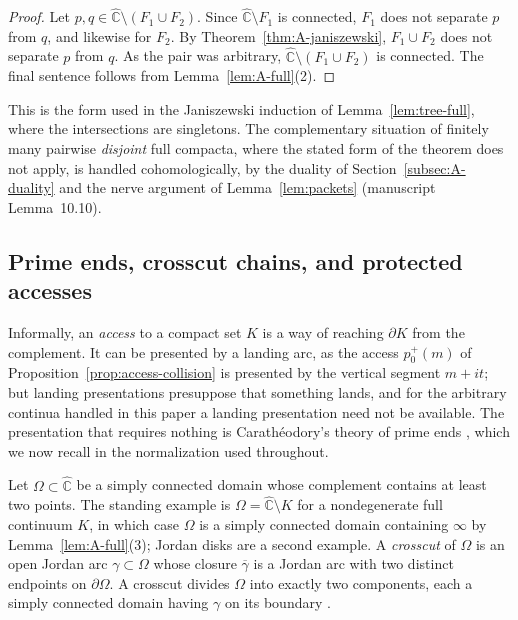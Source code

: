 \documentclass[11pt,reqno]{amsart}
\theoremstyle{definition}
\theoremstyle{remark}
\newcommand{\Chat}{\widehat{\mathbb C}}
\begin{document}
\begin{proof}
Let $p,q\in\Chat\setminus(F_1\cup F_2)$.  Since $\Chat\setminus F_1$ is
connected, $F_1$ does not separate $p$ from $q$, and likewise for $F_2$.
By Theorem~\ref{thm:A-janiszewski}, $F_1\cup F_2$ does not separate $p$
from $q$.  As the pair was arbitrary, $\Chat\setminus(F_1\cup F_2)$ is
connected.  The final sentence follows from Lemma~\ref{lem:A-full}(2).
\end{proof}

This is the form used in the Janiszewski induction of
Lemma~\ref{lem:tree-full}, where the intersections are singletons.  The
complementary situation of finitely many pairwise \emph{disjoint} full
compacta, where the stated form of the theorem does not apply, is handled
cohomologically, by the duality of Section~\ref{subsec:A-duality} and the
nerve argument of Lemma~\ref{lem:packets} (manuscript Lemma~10.10).

\subsection{Prime ends, crosscut chains, and protected accesses}
\label{subsec:A-primeends}

Informally, an \emph{access} to a compact set $K$ is a way of reaching
$\partial K$ from the complement.  It can be presented by a landing arc,
as the access $p_0^{+}(m)$ of Proposition~\ref{prop:access-collision} is
presented by the vertical segment $m+it$; but landing presentations
presuppose that something lands, and for the arbitrary continua handled in
this paper a landing presentation need not be available.  The presentation that requires
nothing is Carath\'eodory's theory of prime ends \cite{Pom92}, which we
now recall in the normalization used throughout.

Let $\Omega\subset\Chat$ be a simply connected domain whose complement
contains at least two points.  The standing example is
$\Omega=\Chat\setminus K$ for a nondegenerate full continuum $K$, in which
case $\Omega$ is a simply connected domain containing $\infty$ by
Lemma~\ref{lem:A-full}(3); Jordan disks are a second example.  A
\emph{crosscut} of $\Omega$ is an open Jordan arc $\gamma\subset\Omega$
whose closure $\overline{\gamma}$ is a Jordan arc with two distinct
endpoints on $\partial\Omega$.  A crosscut divides $\Omega$ into exactly
two components, each a simply connected domain having $\gamma$ on its
boundary \cite{Pom92}.
\end{document}
